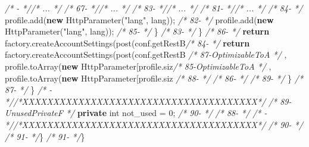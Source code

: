 \documentclass[
]{article}
\newenvironment{Shaded}{\begin{snugshade}}{\end{snugshade}}
\newcommand{\CommentTok}[1]{\textcolor[rgb]{0.56,0.35,0.01}{\textit{#1}}}
\newcommand{\DataTypeTok}[1]{\textcolor[rgb]{0.13,0.29,0.53}{#1}}
\newcommand{\DecValTok}[1]{\textcolor[rgb]{0.00,0.00,0.81}{#1}}
\newcommand{\FunctionTok}[1]{\textcolor[rgb]{0.00,0.00,0.00}{#1}}
\newcommand{\KeywordTok}[1]{\textcolor[rgb]{0.13,0.29,0.53}{\textbf{#1}}}
\newcommand{\NormalTok}[1]{#1}
\newcommand{\StringTok}[1]{\textcolor[rgb]{0.31,0.60,0.02}{#1}}
\begin{document}
\begin{landscape}
\begin{Shaded}
\begin{Highlighting}[]
\CommentTok{/*   -                 *//* ...  */}                                                     \CommentTok{/* 67-                 *//* ...  */}                                                     
\CommentTok{/* 83-                 *//* ...  */}                                                     \CommentTok{/* 81-                 *//* ...  */}                                                     
\CommentTok{/* 84-                 */}\NormalTok{            profile.}\FunctionTok{add}\NormalTok{(}\KeywordTok{new} \FunctionTok{HttpParameter}\NormalTok{(}\StringTok{"lang"}\NormalTok{, lang));      }\CommentTok{/* 82-                 */}\NormalTok{            profile.}\FunctionTok{add}\NormalTok{(}\KeywordTok{new} \FunctionTok{HttpParameter}\NormalTok{(}\StringTok{"lang"}\NormalTok{, lang));      }
\CommentTok{/* 85-                 */}\NormalTok{        \}                                                      }\CommentTok{/* 83-                 */}\NormalTok{        \}                                                      }
\CommentTok{/* 86-                 */}        \KeywordTok{return}\NormalTok{ factory.}\FunctionTok{createAccountSettings}\NormalTok{(}\FunctionTok{post}\NormalTok{(conf.}\FunctionTok{getRestB}\CommentTok{/* 84-                 */}        \KeywordTok{return}\NormalTok{ factory.}\FunctionTok{createAccountSettings}\NormalTok{(}\FunctionTok{post}\NormalTok{(conf.}\FunctionTok{getRestB}
\CommentTok{/* 87-OptimizableToA   */}\NormalTok{                , profile.}\FunctionTok{toArray}\NormalTok{(}\KeywordTok{new}\NormalTok{ HttpParameter[profile.}\FunctionTok{siz}\CommentTok{/* 85-OptimizableToA   */}\NormalTok{                , profile.}\FunctionTok{toArray}\NormalTok{(}\KeywordTok{new}\NormalTok{ HttpParameter[profile.}\FunctionTok{siz}
\CommentTok{/* 88-                 */}                                                               \CommentTok{/* 86-                 */}                                                               
\CommentTok{/* 89-                 */}\NormalTok{    \}                                                          }\CommentTok{/* 87-                 */}\NormalTok{    \}                                                          }
\CommentTok{/*   -                 *//*XXXXXXXXXXXXXXXXXXXXXXXXXXXXXXXXXXXXXX*/}                     \CommentTok{/* 89-UnusedPrivateF   */}    \KeywordTok{private} \DataTypeTok{int}\NormalTok{ not_used = }\DecValTok{0}\NormalTok{;                                  }
\CommentTok{/* 90-                 */}                                                               \CommentTok{/* 88-                 */}                                                               
\CommentTok{/*   -                 *//*XXXXXXXXXXXXXXXXXXXXXXXXXXXXXXXXXXXXXX*/}                     \CommentTok{/* 90-                 */}                                                               
\CommentTok{/* 91-                 */}\NormalTok{\}                                                              }\CommentTok{/* 91-                 */}\NormalTok{\}                                                              }
\end{Highlighting}
\end{Shaded}


\end{landscape}
\end{document}
